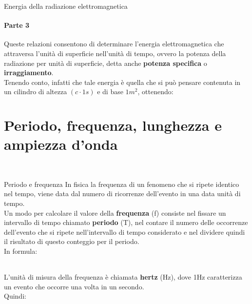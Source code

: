 \documentclass[aspectratio=169]{beamer}
\newcommand*{\vet}{\fontfamily{qzc}\selectfont}
\begin{document}
\begin{frame}{Energia della radiazione elettromagnetica}
	\framesubtitle{Parte 3}
	Queste relazioni consentono di determinare l'energia elettromagnetica che attraversa l'unità di superficie nell'unità di tempo, ovvero la potenza della radiazione per unità di superficie, detta anche \textbf{potenza specifica} o \textbf{irraggiamento}.\\
	Tenendo conto, infatti che tale energia è quella che si può pensare contenuta in un cilindro di altezza $(c \cdot 1 s)$ e di base $1 m^2$, ottenendo: \\
	\medskip
\end{frame}

\section{Periodo, frequenza, lunghezza e ampiezza d'onda}
\begin{frame}
	\\
\end{frame}

\begin{frame}{Periodo e frequenza}
	In fisica la frequenza di un fenomeno che si ripete identico nel tempo, viene data dal numero di ricorrenze dell'evento in una data unità di tempo.\\
	\smallskip
	Un modo per calcolare il valore della \textbf{frequenza} ({\vet f}) consiste nel fissare un intervallo di tempo chiamato \textbf{periodo} (T), nel contare il numero delle occorrenze dell'evento che si ripete nell'intervallo di tempo considerato e nel dividere quindi il risultato di questo conteggio per il periodo.\\
	In formula:\\
	\medskip
	\centering{{\textcolor{red!80}{{\vet f} = $\frac{1}{T}$}}}\\
	\medskip
	\raggedright{L'unità di misura della frequenza è chiamata \textbf{hertz} (Hz), dove 1Hz caratterizza un evento che occorre una volta in un secondo.}\\
	Quindi:\\
\end{frame}
\end{document}
